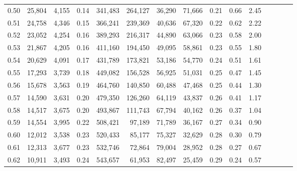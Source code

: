 \begin{tabular}{rrrcrrrrrrrrrrr}
0.50 &  25,804 &  4,155 &                                       0.14 &  341,483 &  264,127 &   36,290 &   71,666 &  0.21 &  0.66 &                         2.45 \\
0.51 &  24,758 &  4,346 &                                       0.15 &  366,241 &  239,369 &   40,636 &   67,320 &  0.22 &  0.62 &                         2.22 \\
0.52 &  23,052 &  4,254 &                                       0.16 &  389,293 &  216,317 &   44,890 &   63,066 &  0.23 &  0.58 &                         2.00 \\
0.53 &  21,867 &  4,205 &                                       0.16 &  411,160 &  194,450 &   49,095 &   58,861 &  0.23 &  0.55 &                         1.80 \\
0.54 &  20,629 &  4,091 &                                       0.17 &  431,789 &  173,821 &   53,186 &   54,770 &  0.24 &  0.51 &                         1.61 \\
0.55 &  17,293 &  3,739 &                                       0.18 &  449,082 &  156,528 &   56,925 &   51,031 &  0.25 &  0.47 &                         1.45 \\
0.56 &  15,678 &  3,563 &                                       0.19 &  464,760 &  140,850 &   60,488 &   47,468 &  0.25 &  0.44 &                         1.30 \\
0.57 &  14,590 &  3,631 &                                       0.20 &  479,350 &  126,260 &   64,119 &   43,837 &  0.26 &  0.41 &                         1.17 \\
0.58 &  14,517 &  3,675 &                                       0.20 &  493,867 &  111,743 &   67,794 &   40,162 &  0.26 &  0.37 &                         1.04 \\
0.59 &  14,554 &  3,995 &                                       0.22 &  508,421 &   97,189 &   71,789 &   36,167 &  0.27 &  0.34 &                         0.90 \\
0.60 &  12,012 &  3,538 &                                       0.23 &  520,433 &   85,177 &   75,327 &   32,629 &  0.28 &  0.30 &                         0.79 \\
0.61 &  12,313 &  3,677 &                                       0.23 &  532,746 &   72,864 &   79,004 &   28,952 &  0.28 &  0.27 &                         0.67 \\
0.62 &  10,911 &  3,493 &                                       0.24 &  543,657 &   61,953 &   82,497 &   25,459 &  0.29 &  0.24 &                         0.57 \\

\end{tabular}
